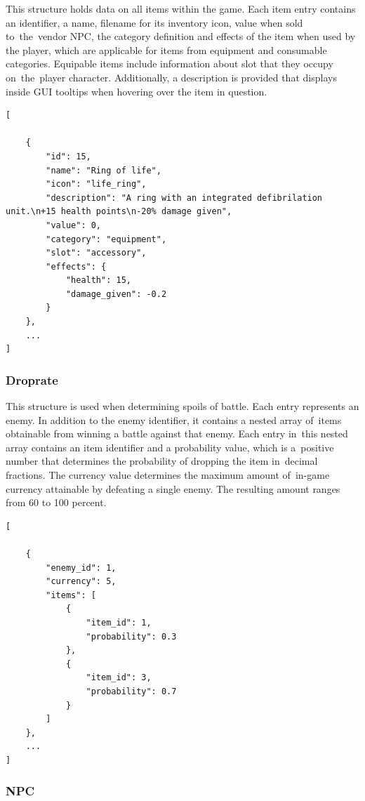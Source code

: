 \documentclass[thesis=B,english,hidelinks]{FITthesisXE}[2012/06/26]
\begin{document}
This structure holds data on all items within the game. Each item entry contains an identifier, a name, filename for its inventory icon, value when sold to~the~vendor NPC, the category definition and effects of the item when used by the player, which are applicable for items from equipment and consumable categories. Equipable items include information about slot that they occupy on~the~player character. Additionally, a description is provided that displays inside GUI tooltips when hovering over the item in question.

\begin{lstlisting}
[

    {
        "id": 15,
        "name": "Ring of life",
        "icon": "life_ring",
        "description": "A ring with an integrated defibrilation unit.\n+15 health points\n-20% damage given",
        "value": 0,
        "category": "equipment",
        "slot": "accessory",
        "effects": {
            "health": 15,
            "damage_given": -0.2
        }
    },
    ...
]
\end{lstlisting}

\subsubsection{Droprate}

This structure is used when determining spoils of battle. Each entry represents an enemy. In addition to the enemy identifier, it contains a nested array of~items obtainable from winning a battle against that enemy. Each entry in~this nested array contains an item identifier and a probability value, which is a~positive number that determines the probability of dropping the item in~decimal fractions. The currency value determines the maximum amount of~in-game currency attainable by defeating a single enemy. The resulting amount ranges from 60 to 100 percent.

\begin{lstlisting}
[

    {
        "enemy_id": 1,
        "currency": 5,
        "items": [
            {
                "item_id": 1,
                "probability": 0.3
            },
            {
                "item_id": 3,
                "probability": 0.7
            }
        ]
    },
    ...
]
\end{lstlisting}

\subsubsection{NPC}
\end{document}
